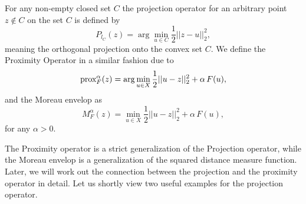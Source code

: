     \begin{definition} %
    \label{def:projection_operator}

        For any non-empty closed set $C$ the projection operator for an arbitrary point $z \notin C$ on the set $C$ is defined by
            \begin{equation}
                P_{l_{C}}(z) = \arg \min_{u \in C} \frac{1}{2} ||z - u||_{2}^{2},
                \label{eq:projection_operator}
            \end{equation}
        meaning the orthogonal projection onto the convex set $C$. We define the Proximity Operator in a similar fashion due to
            \begin{equation}
                \textnormal{prox}^{\alpha}_{F}(z) = \arg \min_{u \in X} \frac{1}{2} ||u - z||_{2}^{2} + \alpha \, F(u),
                \label{eq:proximity_operator}
            \end{equation}
        and the Moreau envelop as
            \begin{equation}
                M^{\alpha}_{F}(z) = \min_{u \in X} \frac{1}{2} ||u - z||_{2}^{2} + \alpha \, F(u),
                \label{eq:envelop_operator}
            \end{equation}
        for any $\alpha > 0$.
    \end{definition}

    The Proximity operator is a strict generalization of the Projection operator, while the Moreau envelop is a generalization of the squared distance measure function. Later, we will work out the connection between the projection and the proximity operator in detail. Let us shortly view two useful examples for the projection operator.


